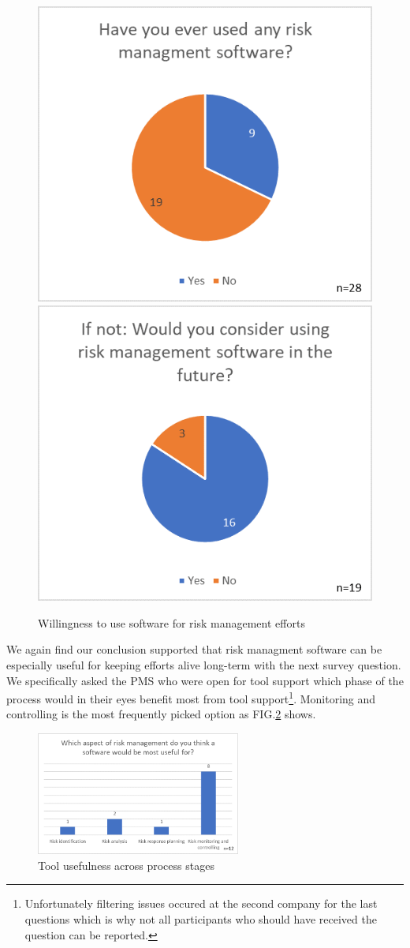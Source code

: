 \begin{figure}[H]
	\centering
	\includegraphics[width=.45\textwidth]{Assets/survey_results/Q5.png}
	\includegraphics[width=.45\textwidth]{Assets/survey_results/Q6.png}
	\caption{Willingness to use software for risk management efforts}
	\label{fig:label24}
\end{figure}

We again find our conclusion supported that risk managment software can be especially useful for keeping efforts alive long-term with the next survey question. We specifically asked the PMS who were open for tool support which phase of the process would in their eyes benefit most from tool support\footnote{Unfortunately filtering issues occured at the second company for the last questions which is why not all participants who should have received the question can be reported.}. Monitoring and controlling is the most frequently picked option as FIG.\ref{fig:label25} shows. 

\begin{figure}[H]
	\centering
	\includegraphics[width=0.6\textwidth]{Assets/survey_results/Q8.png}
	\caption{Tool usefulness across process stages}
	\label{fig:label25}
\end{figure}

